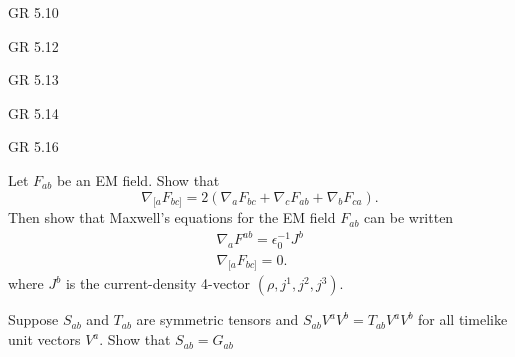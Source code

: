 \documentclass[minion]{homework}
\begin{document}
\begin{aproblems}

\hproblem GR 5.10

\hproblem GR 5.12

\hproblem GR 5.13

\hproblem GR 5.14

\hproblem GR 5.16

\hproblem Let $F_{ab}$ be an EM field. Show that
\[
\nabla_{[a} F_{bc]} = 2(\nabla_a F_{bc} + \nabla_{c} F_{ab} + \nabla_{b}F_{ca}).
\]
Then show that Maxwell's equations for the EM field $F_{ab}$ can be written
\begin{align}
\nabla_a F^{ab} = \epsilon_0^{-1} J^b\\
\nabla_{[a} F_{bc]} = 0.
\end{align}
where $J^b$ is the current-density 4-vector $(\rho,j^1,j^2,j^3)$.

\hproblem Suppose $S_{ab}$ and $T_{ab}$ are symmetric tensors and 
$S_{ab}V^aV^b=T_{ab}V^aV^b$ for all timelike unit vectors $V^a$.  Show that
$S_{ab}=G_{ab}$


\end{aproblems}
\end{document}
